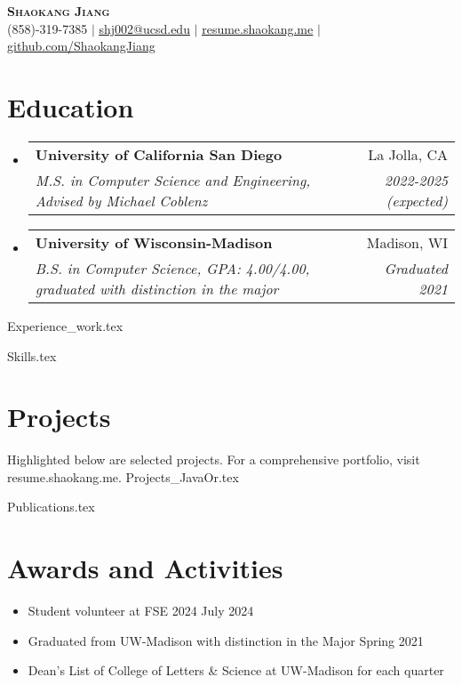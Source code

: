 \documentclass[letterpaper,11pt]{article}
\makeatletter
\newcommand{\resumeItem}[1]{
  \item\small{
    {#1 \vspace{-2pt}}
  }
}
\newcommand{\resumeSubheading}[4]{
  \vspace{-2pt}\item
    \begin{tabular*}{0.97\textwidth}[t]{l@{\extracolsep{\fill}}r}
      \textbf{#1} & #2 \\
      \textit{\small#3} & \textit{\small #4} \\
    \end{tabular*}\vspace{-7pt}
}
\newcommand{\resumeSubHeadingListStart}{\begin{itemize}[leftmargin=0.12in, label={}]}
\newcommand{\resumeSubHeadingListEnd}{\end{itemize}}
\newcommand{\resumeItemListStart}{\begin{itemize}}
\newcommand{\resumeItemListEnd}{\end{itemize}\vspace{-5pt}}
\makeatother
\begin{document}

\begin{center}
    \textbf{\Huge \scshape Shaokang Jiang} \\ \vspace{1pt}
    \small (858)-319-7385 $|$ \href{mailto:shj002@ucsd.edu}{\underline{shj002@ucsd.edu}} $|$ 
    \href{https://resume.shaokang.me}{\underline{resume.shaokang.me}} $|$
    \href{https://github.com/ShaokangJiang}{\underline{github.com/ShaokangJiang}}
\end{center}


\section{Education}
  \resumeSubHeadingListStart
    \resumeSubheading
      {University of California San Diego}{La Jolla, CA}
      {M.S. in Computer Science and Engineering, Advised by Michael Coblenz}{2022-2025 (expected)}
    \resumeSubheading
      {University of Wisconsin-Madison}{Madison, WI}
      {B.S. in Computer Science, GPA: 4.00/4.00, graduated with distinction in the major}{Graduated 2021}
  \resumeSubHeadingListEnd


  
{Experience_work.tex}

%
{Skills.tex}


\section{Projects}

Highlighted below are selected projects. For a comprehensive portfolio, visit resume.shaokang.me.
\vspace{0.5em}
{Projects_JavaOr.tex}




% 
{Publications.tex}


\section{Awards and Activities}

\resumeItemListStart
\resumeItem{Student volunteer at FSE 2024 \hfill July 2024}
\resumeItem{Graduated from UW-Madison with distinction in the Major \hfill Spring 2021}
\resumeItem{Dean's List of College of Letters \& Science at UW-Madison for each quarter}
\resumeItemListEnd


\end{document}
